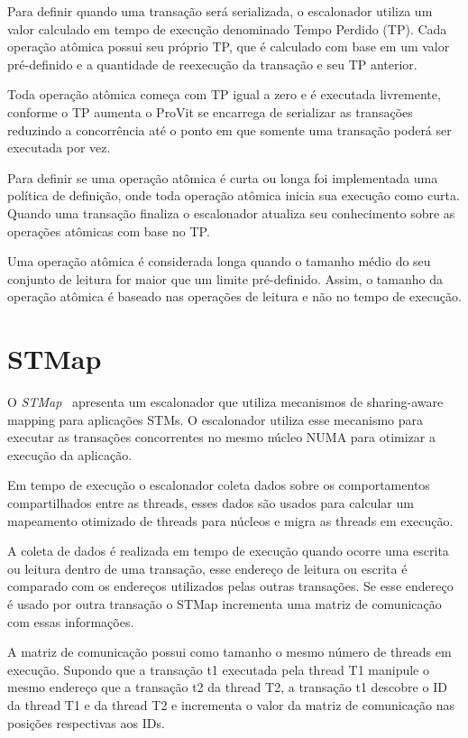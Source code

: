 \documentclass[diss,capa]{texufpel}
\begin{document}
Para definir quando uma transação será serializada, o escalonador utiliza um valor calculado em tempo de execução denominado Tempo Perdido (TP). Cada operação atômica possui seu próprio TP, que é calculado com base em um valor pré-definido e a quantidade de reexecução da transação e seu TP anterior.

Toda operação atômica começa com TP igual a zero e é executada livremente, conforme o TP aumenta o ProVit se encarrega de serializar as transações reduzindo a concorrência até o ponto em que somente uma transação poderá ser executada por vez.

Para definir se uma operação atômica é curta ou longa foi implementada uma política de definição, onde toda operação atômica inicia sua execução como curta. Quando uma transação finaliza o escalonador atualiza seu conhecimento sobre as operações atômicas com base no TP.

Uma operação atômica é considerada longa quando o tamanho médio do seu conjunto de leitura for maior que um limite pré-definido. Assim, o tamanho da operação atômica é baseado nas operações de leitura e não no tempo de execução.

\section{STMap}

O \emph{STMap}~\cite{pasqualin2020online} apresenta um escalonador que utiliza mecanismos de sharing-aware mapping para aplicações STMs. O escalonador utiliza esse mecanismo para executar as transações concorrentes no mesmo núcleo NUMA para otimizar a execução da aplicação.

Em tempo de execução o escalonador coleta dados sobre os comportamentos compartilhados entre as threads, esses dados são usados para calcular um mapeamento otimizado de threads para núcleos e migra as threads em execução.

A coleta de dados é realizada em tempo de execução quando ocorre uma escrita ou leitura dentro de uma transação, esse endereço de leitura ou escrita é comparado com os endereços utilizados pelas outras transações. Se esse endereço é usado por outra transação o STMap incrementa uma matriz de comunicação com essas informações.

A matriz de comunicação possui como tamanho o mesmo número de threads em execução. Supondo que a transação t1 executada pela thread T1 manipule o mesmo endereço que a transação t2 da thread T2, a transação t1 descobre o ID da thread T1 e da thread T2 e incrementa o valor da matriz de comunicação nas posições respectivas aos IDs.
\end{document}
